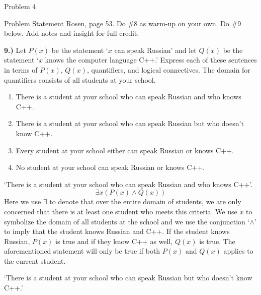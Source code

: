 \begin{problem}{Problem 4}
    \begin{statement}{Problem Statement}
        Rosen, page 53.  Do \#8 as warm-up on your own. Do \#9 below. Add notes and insight for full credit. \vspace*{1em}

        \textbf{9.)} Let $P(x)$ be the statement `$x$ can speak Russian' and let $Q(x)$ be the statement `$x$ knows the computer language C++.' Express each of these sentences in terms of $P(x)$, $Q(x)$, 
        quantifiers, and logical connectives. The domain for quantifiers consists of all students at your school.

        \begin{enumerate}[label=(\alph*)]
            \item There is a student at your school who can speak Russian and who knows C++.
            \item There is a student at your school who can speak Russian but who doesn't know C++.
            \item Every student at your school either can speak Russian or knows C++.
            \item No student at your school can speak Russian or knows C++.
        \end{enumerate}
    \end{statement}

    \begin{highlight}
        `There is a student at your school who can speak Russian and who knows C++'.
        \setcounter{equation}{0}
        \begin{equation}
            \exists x (P(x) \wedge Q(x))
        \end{equation}
        Here we use $\exists$ to denote that over the entire domain of students, we are only concerned that there is at least one student who meets this criteria. We use $x$ to symbolize the domain of all
        students at the school and we use the conjunction `$\wedge$' to imply that the student knows Russian and C++. If the student knows Russian, $P(x)$ is true and if they know C++ as well, $Q(x)$ is true.
        The aforementioned statement will only be true if both $P(x)$ and $Q(x)$ applies to the current student.
    \end{highlight}

    \begin{highlight}
        `There is a student at your school who can speak Russian but who doesn't know C++.'


\end{highlight}
\end{problem}
